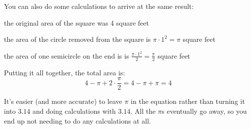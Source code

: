 \documentclass[fleqn,addpoints]{exam}
\begin{document}
\begin{questions}
\begin{solution}[5 cm]
You can also do some calculations to arrive at the same result:
\begin{itemize*}
  \item the original area of the square was 4 square feet
  \item the area of the circle removed from the square is $\pi \cdot 1^2 = \pi$ square feet
  \item the area of one semicircle on the end is is $\frac{\pi \cdot 1^2}{2} = \frac{\pi}{2}$ square feet
\end{itemize*}

Putting it all together, the total area is: 
\[ 4 - \pi + 2 \cdot \frac{\pi}{2} = 4 - \pi + \pi = 4 \]

It's easier (and more accurate) to leave $\pi$ in the equation rather than turning it into $3.14$ and doing calculations
with $3.14$.  All the $\pi$s eventually go away, so you end up not needing to do any calculations at all.

\end{solution}


\end{questions}
\end{document}
